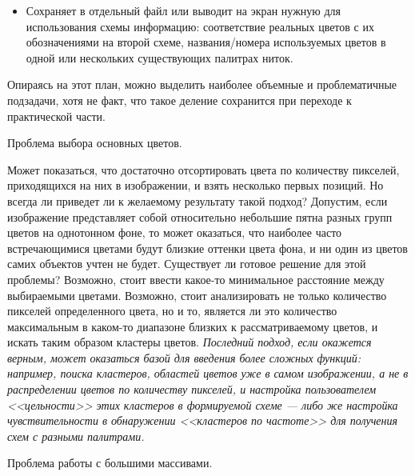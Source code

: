 \documentclass[12pt]{article}
\begin{document}
{\begin{itemize}
\begin{itemize}
		\item Изображение, разбитое на различимые квадраты-пиксели,  цвета которых могут быть изменены с целью "читаемости" (если в схеме используются два близких оттенка одного цвета, на втором варианте схемы один из них может быть смещен в какой-то другой цвет, чтобы пользователь в дальнейшем их не путал) и с наложенным поверх каждого квадрата значком, отдельным для каждого цвета (точка, меньший квадрат, треугольник, пара полос и т. д.) с той же целью;
		\end{itemize}
	\item Сохраняет в отдельный файл или выводит на экран нужную для использования схемы информацию: соответствие реальных цветов с их обозначениями на второй схеме, названия/номера используемых цветов в одной или нескольких существующих палитрах ниток.
	\end{itemize}
	
	Опираясь на этот план, можно выделить наиболее объемные и проблематичные подзадачи, хотя не факт, что такое деление сохранится при переходе к практической части.
	
	\checkmark Проблема выбора основных цветов. 
	
	Может показаться, что достаточно отсортировать цвета по количеству пикселей, приходящихся на них в изображении, и взять несколько первых позиций. Но всегда ли приведет ли к желаемому результату такой подход? Допустим, если изображение представляет собой относительно небольшие пятна разных групп цветов на однотонном фоне, то может оказаться, что наиболее часто встречающимися цветами будут близкие оттенки цвета фона, и ни один из цветов самих объектов учтен не будет. Существует ли готовое решение для этой проблемы? Возможно, стоит ввести какое-то минимальное расстояние между выбираемыми цветами. Возможно, стоит анализировать не только количество пикселей определенного цвета, но и то, является ли это количество максимальным в каком-то диапазоне близких к рассматриваемому цветов, и искать таким образом кластеры цветов. {\it Последний подход, если окажется верным, может оказаться базой для введения более сложных функций: например, поиска кластеров, областей цветов уже в самом изображении, а не в распределении цветов по количеству пикселей, и настройка пользователем <<цельности>> этих кластеров в формируемой схеме — либо же настройка чувствительности в обнаружении <<кластеров по частоте>> для получения схем с разными палитрами.}
 	
	\checkmark Проблема работы с большими массивами. 
	
}
\end{document}
